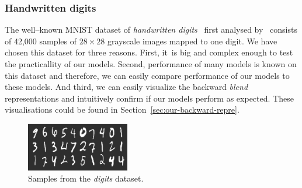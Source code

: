 \subsubsection{Handwritten digits} 
\label{sec:datasets-digits} 

The well--known MNIST dataset of \emph{handwritten digits}~\citep{digits2014mnist} first analysed by~\citet{lecun1998gradient} consists of 42,000 samples of $28 \times 28$ grayscale images mapped to one digit. We have chosen this dataset for three reasons. First, it~is big and complex enough to test the practicallity of our models. Second, performance of many models is known on this dataset and therefore, we can easily compare performance of our models to these models. And third, we can easily visualize the backward \emph{blend} representations and intuitively confirm if our models perform as expected. These visualisations could be found in Section~\ref{sec:our-backward-repre}. 

\begin{figure}[H]
  \centering
  \includegraphics[width=0.4\textwidth]{img/digits.png} 
  \caption{Samples from the \emph{digits} dataset.}
  \label{fig:datasets-digits}
\end{figure}


